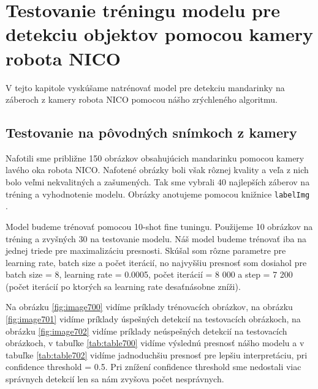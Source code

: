 \chapter{Testovanie tréningu modelu pre detekciu objektov pomocou kamery robota NICO}\label{chap:results}

V tejto kapitole vyskúšame natrénovať model pre detekciu mandarinky na záberoch z kamery robota NICO pomocou nášho zrýchleného algoritmu.

\section{Testovanie na pôvodných snímkoch z kamery}

Nafotili sme približne 150 obrázkov obsahujúcich mandarinku pomocou kamery lavého oka robota NICO. Nafotené obrázky boli však rôznej kvality a veľa z nich bolo veľmi nekvalitných a zašumených. Tak sme vybrali 40 najlepších záberov na tréning a vyhodnotenie modelu. Obrázky anotujeme pomocou knižnice \texttt{labelImg} \cite{labelImg}.

Model budeme trénovať pomocou 10-shot fine tuningu. Použijeme 10 obrázkov na tréning a zvyšných 30 na testovanie modelu. Náš model budeme trénovať iba na jednej triede pre maximalizáciu presnosti. Skúšal som rôzne parametre pre learning rate, batch size a počet iterácií, no najvyššiu presnosť som dosiahol pre batch size = 8, learning rate = 0.0005, počet iterácií = 8 000 a step = 7 200 (počet iterácií po ktorých sa learning rate desaťnásobne zníži). 

Na obrázku \ref{fig:image700} vidíme príklady trénovacích obrázkov, na obrázku \ref{fig:image701} vidíme príklady úspešných detekcií na testovacích obrázkoch, na obrázku \ref{fig:image702} vidíme príklady neúspešných detekcií na testovacích obrázkoch, v tabuľke \ref{tab:table700} vidíme výslednú presnosť nášho modelu a v tabuľke \ref{tab:table702} vidíme jadnoduchšiu presnosť pre lepšiu interpretáciu, pri confidence threshold = 0.5. Pri znížení confidence threshold sme nedostali viac správnych detekcií len sa nám zvyšova počet nesprávnych. 

